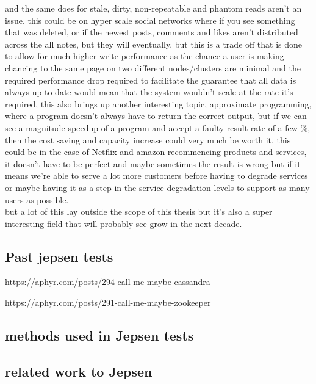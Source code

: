 \documentclass[a4paper,10pt,titlepage]{report}
\begin{document}
and the same does for stale, dirty, non-repeatable and phantom reads aren't an issue. this could be on hyper scale social networks where if you see something that was deleted, or if the newest posts, comments and likes aren't distributed across the all notes, but they will eventually. but this is a trade off that is done to allow for much higher write performance as the chance a user is making chancing to the same page on two different nodes/clusters are minimal and the required performance drop required to facilitate the guarantee that all data is always up to date would mean that the system wouldn't scale at the rate it's required, this also brings up another interesting topic, approximate programming, where a program doesn't always have to return the correct output, but if we can see a magnitude speedup of a program and accept a faulty result rate of a few \%, then the cost saving and capacity increase could very much be worth it. this could be in the case of Netflix and amazon recommencing products and services, it doesn't have to be perfect and maybe sometimes the result is wrong but if it means we're able to serve a lot more customers before having to degrade services or maybe having it as a step in the service degradation levels to support as many users as possible. \\

but a lot of this lay outside the scope of this thesis but it's also a super interesting field that will probably see grow in the next decade.





\subsection{Past jepsen tests}

https://aphyr.com/posts/294-call-me-maybe-cassandra


https://aphyr.com/posts/291-call-me-maybe-zookeeper







\subsection{methods used in Jepsen tests}

\subsection{related work to Jepsen}
\end{document}
